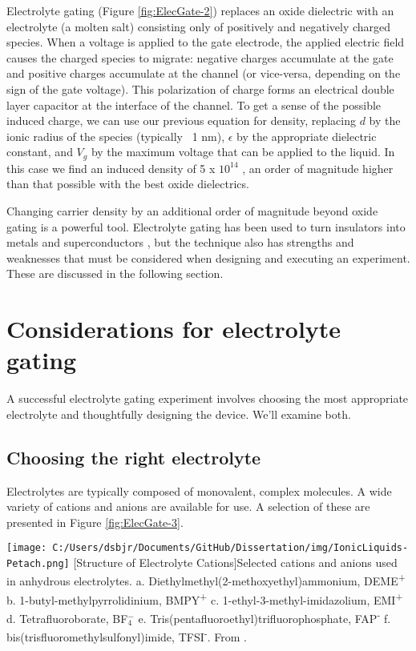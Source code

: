 Electrolyte gating (Figure \ref{fig:ElecGate-2}) replaces an oxide dielectric with an electrolyte (a molten salt) consisting only of positively and negatively charged species. When a voltage is applied to the gate electrode, the applied electric field causes the charged species to migrate: negative charges accumulate at the gate and positive charges accumulate at the channel (or vice-versa, depending on the sign of the gate voltage). This polarization of charge forms an electrical double layer capacitor at the interface of the channel. To get a sense of the possible induced charge, we can use our previous equation for density, replacing $d$ by the ionic radius of the species (typically ~1 nm), $\epsilon$ by the appropriate dielectric constant, and $V_{g}$ by the maximum voltage that can be applied to the liquid. In this case we find an induced density of 5 x $10^{14}$ \percmsq , an order of magnitude higher than that possible with the best oxide dielectrics.

Changing carrier density by an additional order of magnitude beyond oxide gating is a powerful tool. Electrolyte gating has been used to turn insulators into metals \cite{Wang2015} and superconductors \cite{Ueno2008}, but the technique also has strengths and weaknesses that must be considered when designing and executing an experiment. These are discussed in the following section.

\section{Considerations for electrolyte gating}

A successful electrolyte gating experiment involves choosing the most appropriate electrolyte and thoughtfully designing the device. We'll examine both.

\subsection{Choosing the right electrolyte}

Electrolytes are typically composed of monovalent, complex molecules. A wide variety of cations and anions are available for use. A selection of these are presented in Figure \ref{fig:ElecGate-3}.

\begin{centering}
\texttt{[image: C:/Users/dsbjr/Documents/GitHub/Dissertation/img/IonicLiquids-Petach.png]}
  \captionsetup{width=0.75\textwidth}
  [Structure of Electrolyte Cations]{Selected cations and anions used in anhydrous electrolytes. a. Diethylmethyl(2-methoxyethyl)ammonium, DEME\textsuperscript{+} b. 1-butyl-methylpyrrolidinium, BMPY\textsuperscript{+} c. 1-ethyl-3-methyl-imidazolium, EMI\textsuperscript{+} d. Tetrafluoroborate, BF$_{4}^{-}$ e. Tris(pentafluoroethyl)trifluorophosphate, FAP\textsuperscript{-} f. bis(trisfluoromethylsulfonyl)imide, TFSI\textsuperscript{-}. From \cite{Petach2017}.} 
  \label{fig:ElecGate-3}
\end{centering}

